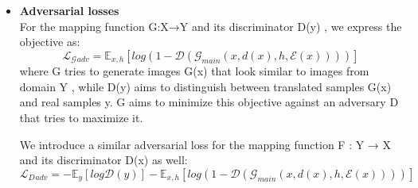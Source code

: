 \begin{itemize}
  \item \textbf{Adversarial losses} \\
        For the mapping function G:X→Y and its discriminator D(y) , we express the objective as:
        \begin{equation}
          \mathcal{L}_\mathcal{G}{_{adv}}  =  \mathbb{E}_{x,h}[log\left( 1 - \mathcal{D} \left( \mathcal{G}_{main} \left( x, d \left( x \right), h, \mathcal{E} \left( x \right) \right) \right) \right)]
        \end{equation}
        where G tries to generate images G(x) that look similar to images from domain Y , while D(y) aims to distinguish between translated samples G(x) and real samples y. G aims to minimize this objective against an adversary D that tries to maximize it.

        We introduce a similar adversarial loss for the mapping
        function F : Y → X and its discriminator D(x) as well:
        \begin{equation}
          \mathcal{L}_D{_{adv}} = - \mathbb{E}_y [ log\mathcal{D}\left(y\right)] - \mathbb{E}_{x,h}[log\left(1 - \mathcal{D}\left(\mathcal{G}_{main}\left(x,d\left(x\right),h,\mathcal{E}\left(x\right)\right)\right)\right)]
        \end{equation}
        \pagebreak



\end{itemize}
